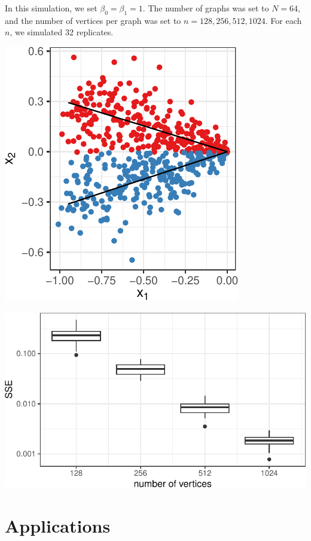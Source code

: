 \documentclass[
  11pt,
]{article}
\begin{document}
In this simulation, we set \(\beta_0 = \beta_1 = 1\). The number of
graphs was set to \(N = 64\), and the number of vertices per graph was
set to \(n = 128, 256, 512, 1024\). For each \(n\), we simulated 32
replicates.

\begin{center}\includegraphics{draft_files/figure-latex/angle-reg-example-1} \end{center}

\begin{center}\includegraphics{draft_files/figure-latex/angle-reg-results-1} \end{center}

\hypertarget{applications}{%
\section{Applications}\label{applications}}
\end{document}

